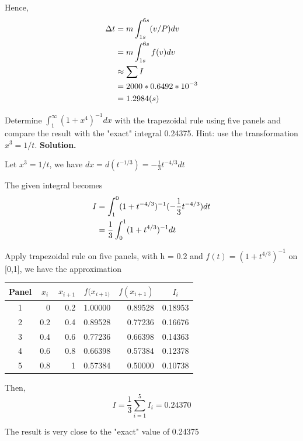 \begin{exercise}{2}
Hence,
\begin{align}
\Delta t &= m \int_{1s}^{6s}(v/P)dv \notag \\
        &=m \int_{1s}^{6s}f(v)dv \notag \\
        &\approx \sum I \notag \\
        &=2000*0.6492*10^{-3} \notag \\
        &=1.2984 (s) \notag
\end{align}
\end{exercise}


\begin{exercise}{3} %

Determine $\int_1^{\infty} (1+x^4)^{-1}dx$ with the trapezoidal rule using five panels and compare
the result with the "exact" integral 0.24375. Hint: use the transformation $x^3 = 1/t$. 
\textbf{Solution.}

Let $x^3 = 1/t$, we have $dx=d(t^{-1/3})=-\frac{1}{3}t^{-4/3}dt$

The given integral becomes
\begin{align}
I&=\int_1^0 (1+t^{-4/3})^{-1}(-\frac{1}{3}t^{-4/3})dt \notag \\
&=\frac{1}{3}\int_0^1 (1+t^{4/3})^{-1}dt \notag 
\end{align}

Apply trapezoidal rule on five panels, with h = 0.2 and $f(t) = (1+t^{4/3})^{-1}$ on [0,1], we have the approximation

\begin{table}[h]
\centering
\begin{tabular}{|crrrrr|}
\hline
\textbf{Panel} & \multicolumn{1}{c}{$x_i$} & \multicolumn{1}{c}{$x_{i+1}$} & \multicolumn{1}{c}{$f(x_{i+1)}$} & \multicolumn{1}{c}{$f(x_{i+1})$} & \multicolumn{1}{c|}{$I_{i}$} \\ \hline
1 & 0 & 0.2 & 1.00000 & 0.89528 & 0.18953 \\
2 & 0.2 & 0.4 & 0.89528 & 0.77236 & 0.16676 \\
3 & 0.4 & 0.6 & 0.77236 & 0.66398 & 0.14363 \\
4 & 0.6 & 0.8 & 0.66398 & 0.57384 & 0.12378 \\
5 & 0.8 & 1 & 0.57384 & 0.50000 & 0.10738 \\ \hline
\end{tabular}

\end{table}

Then,
$$I = \frac{1}{3}\sum_{i=1}^{5} I_i = 0.24370$$

The result is very close to the "exact" value of 0.24375
\end{exercise}


